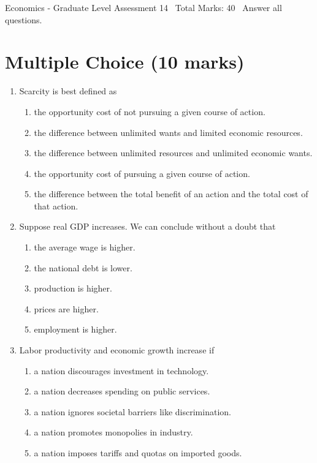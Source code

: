 \documentclass[12pt]{article}
\begin{document}
\begin{center}
Economics - Graduate Level Assessment 14 \
Total Marks: 40 \
Answer all questions.
\end{center}

\section*{Multiple Choice (10 marks)}
\begin{enumerate}[label=\arabic*.]
\item Scarcity is best defined as
\begin{enumerate}[label=(\alph*)]
    \item the opportunity cost of not pursuing a given course of action.
    \item the difference between unlimited wants and limited economic resources.
    \item the difference between unlimited resources and unlimited economic wants.
    \item the opportunity cost of pursuing a given course of action.
    \item the difference between the total benefit of an action and the total cost of that action.
\end{enumerate}
\item Suppose real GDP increases. We can conclude without a doubt that
\begin{enumerate}[label=(\alph*)]
    \item the average wage is higher.
    \item the national debt is lower.
    \item production is higher.
    \item prices are higher.
    \item employment is higher.
\end{enumerate}
\item Labor productivity and economic growth increase if
\begin{enumerate}[label=(\alph*)]
    \item a nation discourages investment in technology.
    \item a nation decreases spending on public services.
    \item a nation ignores societal barriers like discrimination.
    \item a nation promotes monopolies in industry.
    \item a nation imposes tariffs and quotas on imported goods.
\end{enumerate}

\end{enumerate}
\end{document}
